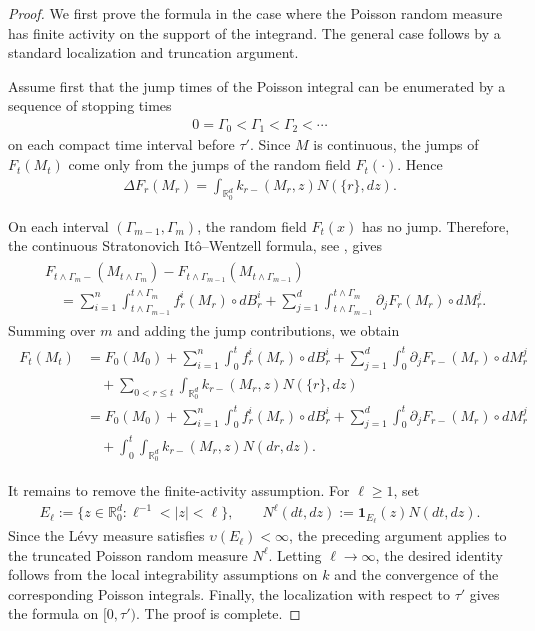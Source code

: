 \documentclass[12pt,oneside, reqno]{amsart}
\newcommand{\ce}{\begin{eqnarray*}}
\newcommand{\de}{\end{eqnarray*}}
\def\geq{\geqslant}
\def\leq{\leqslant}
\numberwithin{equation}{section}
\begin{document}
\begin{proof}
	We first prove the formula in the case where the Poisson random measure has finite activity on the support of the integrand. The general case follows by a standard localization and truncation argument.
	
	Assume first that the jump times of the Poisson integral can be enumerated by a sequence of stopping times
	\ce
	0=\Gamma_0<\Gamma_1<\Gamma_2<\cdots
	\de
	on each compact time interval before $\tau'$. Since $M$ is continuous, the jumps of $F_t(M_t)$ come only from the jumps of the random field $F_t(\cdot)$. Hence
	\ce
	\Delta F_r(M_r)
	=
	\int_{\mathbb R_0^d}k_{r-}(M_r,z)N(\{r\},dz).
	\de
	
	On each interval $(\Gamma_{m-1},\Gamma_m)$, the random field $F_t(x)$ has no jump. Therefore, the continuous Stratonovich Itô--Wentzell formula, see \cite[Chapter 1, Section 8, Theorem 8.3]{dudley1984stochastic}, gives
	\ce
	\begin{aligned}
		&
		F_{t\wedge\Gamma_m-}(M_{t\wedge\Gamma_m})
		-
		F_{t\wedge\Gamma_{m-1}}(M_{t\wedge\Gamma_{m-1}})
		\\
		&\quad =
		\sum_{i=1}^n
		\int_{t\wedge\Gamma_{m-1}}^{t\wedge\Gamma_m}
		f_r^i(M_r)\circ dB_r^i
		+
		\sum_{j=1}^d
		\int_{t\wedge\Gamma_{m-1}}^{t\wedge\Gamma_m}
		\partial_jF_r(M_r)\circ dM_r^j .
	\end{aligned}
	\de
	Summing over $m$ and adding the jump contributions, we obtain
	\ce
	\begin{aligned}
		F_t(M_t)
		&=
		F_0(M_0)
		+
		\sum_{i=1}^n
		\int_0^t f_r^i(M_r)\circ dB_r^i
		+
		\sum_{j=1}^d
		\int_0^t \partial_jF_{r-}(M_r)\circ dM_r^j
		\\
		&\quad
		+
		\sum_{0<r\leq t}
		\int_{\mathbb R_0^d}k_{r-}(M_r,z)N(\{r\},dz)
		\\
		&=
		F_0(M_0)+\sum_{i=1}^n\int_0^t f_r^i(M_r)\circ dB_r^i+	\sum_{j=1}^d
		\int_0^t \partial_jF_{r-}(M_r)\circ dM_r^j	\\
		&\quad+\int_0^t\int_{\mathbb R_0^d}	k_{r-}(M_r,z)N(dr,dz).
	\end{aligned}
	\de
	
	It remains to remove the finite-activity assumption. For $\ell\geq1$, set
	\ce
	E_\ell:=\{z\in\mathbb R_0^d:\ell^{-1}<|z|<\ell\},
	\qquad
	N^\ell(dt,dz):=\mathbf 1_{E_\ell}(z)N(dt,dz).
	\de
	Since the L\'{e}vy measure satisfies $\upsilon(E_\ell)<\infty$, the preceding argument applies to the truncated Poisson random measure $N^\ell$. Letting $\ell\to\infty$, the desired identity follows from the local integrability assumptions on $k$ and the convergence of the corresponding Poisson integrals. Finally, the localization with respect to $\tau'$ gives the formula on $[0,\tau')$. The proof is complete.
\end{proof}
\end{document}
